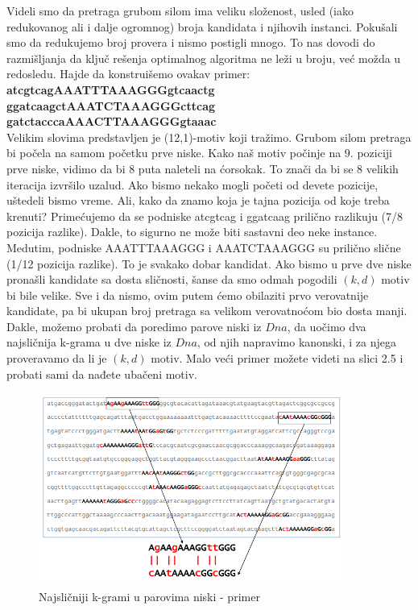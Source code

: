 Videli smo da pretraga grubom silom ima veliku složenost, usled (iako redukovanog ali i dalje ogromnog) broja kandidata i njihovih instanci. Pokušali smo da redukujemo broj provera i nismo postigli mnogo. To nas dovodi do razmišljanja da ključ rešenja optimalnog algoritma ne leži u broju, već možda u redosledu. Hajde da konstruišemo ovakav primer: \\
\textbf{atcgtcagAAATTTAAAGGGgtcaactg \\
ggatcaagctAAATCTAAAGGGcttcag \\
gatctacccaAAACTTAAAGGGgtaaac \\}
Velikim slovima predstavljen je (12,1)-motiv koji tražimo. Grubom silom pretraga bi počela na samom početku prve niske. Kako naš motiv počinje na 9. poziciji prve niske, vidimo da bi 8 puta naleteli na ćorsokak. To znači da bi se 8 velikih iteracija izvršilo uzalud. Ako bismo nekako mogli početi od devete pozicije, uštedeli bismo vreme. Ali, kako da znamo koja je tajna pozicija od koje treba krenuti? Primećujemo da se podniske atcgtcag i ggatcaag prilično razlikuju (7/8 pozicija razlike). Dakle, to sigurno ne može biti sastavni deo neke instance. Medutim, podniske AAATTTAAAGGG i AAATCTAAAGGG su prilično slične (1/12 pozicija razlike). To je svakako dobar kandidat. Ako bismo u prve dve niske pronašli kandidate sa dosta sličnosti, šanse da smo odmah pogodili $(k,d)$ motiv bi bile velike. Sve i da nismo, ovim putem ćemo obilaziti prvo verovatnije kandidate, pa bi ukupan broj pretraga sa velikom verovatnoćom bio dosta manji. Dakle, možemo probati da poredimo parove niski iz $Dna$, da uočimo dva najsličnija k-grama u dve niske iz $Dna$, od njih napravimo kanonski, i za njega proveravamo da li je $(k, d)$ motiv. Malo veći primer možete videti na slici 2.5 i probati sami da nađete ubačeni motiv.

\begin{figure}[h]
\caption{Najsličniji k-grami u parovima niski - primer}
\centering
\includegraphics[width=0.9\textwidth]{poglavlja/2/slike/25.PNG}
\end{figure}

